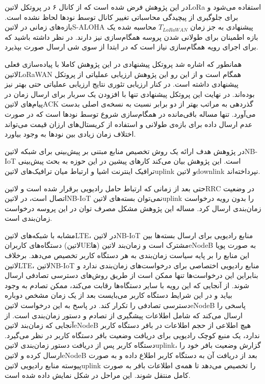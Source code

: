 در این پژوهش فرض شده است که از کانال ۶ در پروتکل ‌لاتین{LoRa} استفاده می‌شود و برای جلوگیری از پیچیدگی محاسباتی تغییر کانال توسط نودها لحاظ نشده است. بازه‌های زمانی در ‌لاتین{S-ALOHA}
پیشنهادی به جز زمان $T_{LoRaWAN}$ محاسبه شده یک بازه اطمینان برای طولانی شدن پروسه همگام‌سازی نیز دارند. در نظر داشته باشید که برای اجرای رویه همگام‌سازی نیاز است که در ابتدا از سوی شی ارسال
صورت بپذیرد.

همانطور که اشاره شد پروتکل پیشنهادی در این پژوهش کاملا با پیاده‌سازی فعلی ‌لاتین{LoRaWAN} همگام است و از این رو این پژوهش ارزیابی عملیاتی از پروتکل پیشنهادی داشته است.
در کنار ارزیابی تئوری نتایج ارزیابی عملیاتی حتی بهتر نیز بوده‌اند. در نهایت این پروتکل پیشنهادی تنها با افزودن یک سربار برای ارسال زمان در پیام‌های ‌لاتین{ACK} گذردهی به مراتب بهتر از دو برابر
نسبت به نسخه‌ی اصلی بدست می‌آورد. تنها مساله باقی‌مانده در همگام‌سازی شروع توسط نودها است که در صورت عدم ارسال داده برای بازه‌ی طولانی و استفاده از کریستال‌های ارزان قیمت می‌تواند
اختلاف زمان زیادی بین نودها به وجود بیاورد.


در پژوهش  هدف ارائه یک روش تخصیص منابع مبتنی بر پیش‌بینی برای شبکه ‌لاتین{NB-IoT} است.
این پژوهش بیان می‌کند کارهای پیشین در این حوزه به بحث پیش‌بینی ترافیک اینترنت اشیا و ارتباط میان ترافیک‌های ‌لاتین{uplink} و ‌لاتین{downlink} نپرداخته‌اند.

حتی بعد از زمانی که ارتباط حامل رادیویی برقرار شده است و ‌لاتین{RRC} در وضعیت اتصال است، در ‌لاتین{NB-IoT} نمی‌توان بسته‌های ‌لاتین{uplink} را بدون
رویه درخواست زمان‌بندی ارسال کرد. مساله این پژوهش مشکل مصرف توان در این پروسه درخواست زمان‌بندی است.

مشابه با شبکه‌های ‌لاتین{LTE}، در ‌لاتین{NB-IoT} منابع رادیویی برای ارسال بسته‌ها بین دستگاه‌های کاربران (‌لاتین{UE}ها) مشترک است و
زمان‌بند ‌لاتین{eNodeB} به صورت پویا این منابع را بر پایه سیاست زمان‌بندی به هر دستگاه کاربر تخصیص می‌دهد.
برخلاف ‌لاتین{LTE}، ‌لاتین{NB-IoT} منابع رادیویی اختصاصی برای درخواست‌های زمان‌بندی ندارد و بنابراین این درخواست‌ها تنها ممکن است از طریق روش‌های دسترسی تصادفی ارسال شوند.
از آنجایی که این رویه با سایر دستگاه‌ها رقابت می‌کند، ممکن تصادم به وجود بیاید و در این شرایط دستگاه کاربر می‌بایست بعد از یک زمان مشخص دوباره دسترسی تصادفی را تکرار کند.
در پاسخ به این درخواست ‌لاتین{eNodeB} پاسخی را ارسال می‌کند که شامل اطلاعات پیشگیری از تصادم و دستور زمان‌بندی است.
از آنجایی که زمان‌بند ‌لاتین{eNodeB} هیچ اطلاعی از حجم اطلاعات در بافر دستگاه کاربر ندارد، یک منبع کوچک رادیویی برای دریافت وضعیت بافر دستگاه کاربر در نظر می‌گیرد.
دستگاه کاربر پس از دریافت دستور زمان‌بندی ‌لاتین{uplink}، گزارش وضعیت بافر خود را ارسال کرده و ‌لاتین{eNodeB} بعد از دریافت آن به دستگاه کاربر اطلاع داده و به صورت پیوسته
منابع رادیویی ‌لاتین{uplink} را تخصیص می‌دهد تا همه‌ی اطلاعات بافر به صورت کامل منتقل شوند.
این مراحل در شکل  نمایش داده شده است.

